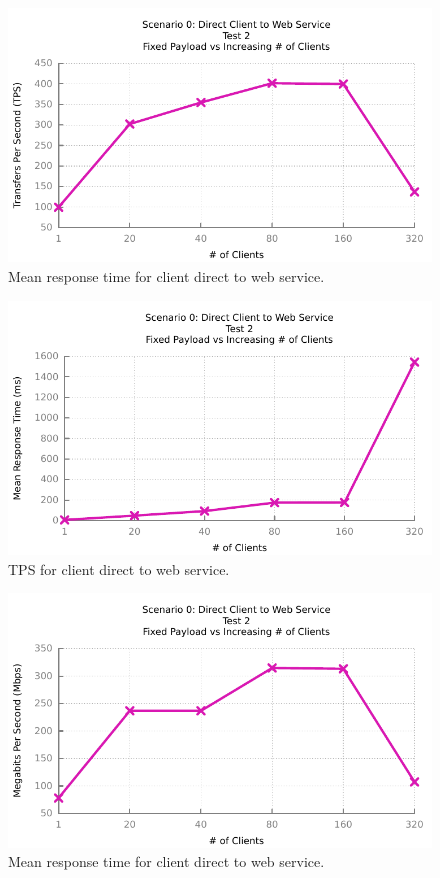 \begin{figure}[H]
	\caption{Mean response time for client direct to web service.}
	\centerline{\includegraphics{img/direct_fp_iu_tps}}
	\label{fig:direct-2-1}
\end{figure}

\begin{figure}[H]
	\caption{TPS for client direct to web service.}
	\centerline{\includegraphics{img/direct_fp_iu_resp}}
	\label{fig:direct-2-2}
\end{figure}

\begin{figure}[H]
	\caption{Mean response time for client direct to web service.}
	\centerline{\includegraphics{img/direct_fp_iu_kbs}}
	\label{fig:direct-2-3}
\end{figure}